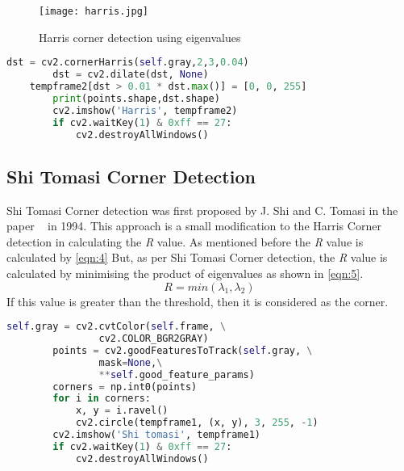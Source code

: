 \begin{figure}[tb]
	\center\texttt{[image: harris.jpg]}
	\caption{Harris corner detection using eigenvalues \cite{harris}}
	\label{fig:harris}
\end{figure}

\begin{lstlisting}[language=Python, frame=single, caption=Python Code to compute Harris Corner detection]
        dst = cv2.cornerHarris(self.gray,2,3,0.04)
        dst = cv2.dilate(dst, None)
	tempframe2[dst > 0.01 * dst.max()] = [0, 0, 255]
        print(points.shape,dst.shape)
        cv2.imshow('Harris', tempframe2)
        if cv2.waitKey(1) & 0xff == 27:
            cv2.destroyAllWindows()
\end{lstlisting}

\subsection{Shi Tomasi Corner Detection}
Shi Tomasi Corner detection was first proposed by J. Shi and C. Tomasi in the paper ~\cite{shi1994good} in 1994. This approach is a small modification to the Harris Corner detection in calculating the \textit{R} value. As mentioned before the \textit{R} value is calculated by \ref{eqn:4}
But, as per Shi Tomasi Corner detection, the \textit{R} value is calculated by minimising the product of eigenvalues as shown in \ref{eqn:5}.
 \begin{equation}\label{eqn:5}
	R = min(\lambda_{1}, \lambda_{2})
\end{equation}
If this value is greater than the threshold, then it is considered as the corner.

\begin{lstlisting}[language=Python, frame=single, caption=Python Code to compute Shi Tomasi Corner detection]
        self.gray = cv2.cvtColor(self.frame, \
        		cv2.COLOR_BGR2GRAY)
        points = cv2.goodFeaturesToTrack(self.gray, \
        		mask=None,\
        		**self.good_feature_params)
        corners = np.int0(points)
        for i in corners:
            x, y = i.ravel()
            cv2.circle(tempframe1, (x, y), 3, 255, -1)
        cv2.imshow('Shi tomasi', tempframe1)
        if cv2.waitKey(1) & 0xff == 27:
            cv2.destroyAllWindows()
\end{lstlisting}

